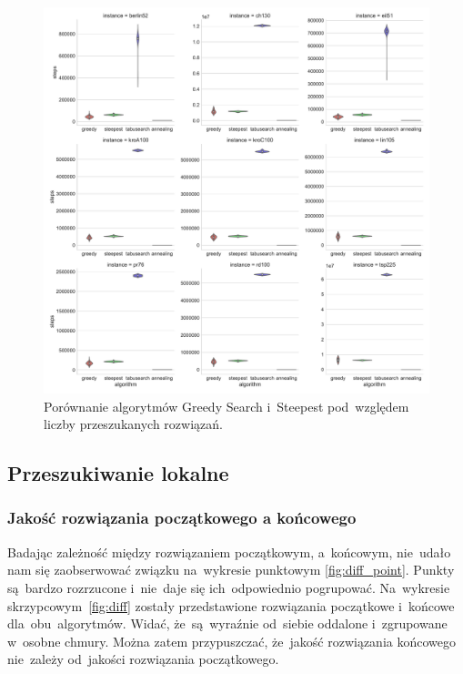 \begin{figure}[H]
\begin{center}
\includegraphics[width=1.0\textwidth]{graphs/steps_comparison_violin.pdf}
\end{center}
\caption{Porównanie algorytmów Greedy Search i~Steepest pod~względem liczby przeszukanych rozwiązań.}
\label{fig:nsol}
\end{figure}

\subsection{Przeszukiwanie lokalne}

\subsubsection{Jakość rozwiązania początkowego a końcowego}

Badając zależność między rozwiązaniem początkowym, a~końcowym, nie~udało nam się zaobserwować związku na~wykresie punktowym \ref{fig:diff_point}. Punkty są~bardzo rozrzucone i~nie~daje się ich~odpowiednio pogrupować. Na~wykresie skrzypcowym~\ref{fig:diff} zostały przedstawione rozwiązania początkowe i~końcowe dla~obu~algorytmów. Widać, że~są~wyraźnie od~siebie oddalone i~zgrupowane w~osobne chmury. Można zatem przypuszczać, że~jakość rozwiązania końcowego nie~zależy od~jakości rozwiązania początkowego.

